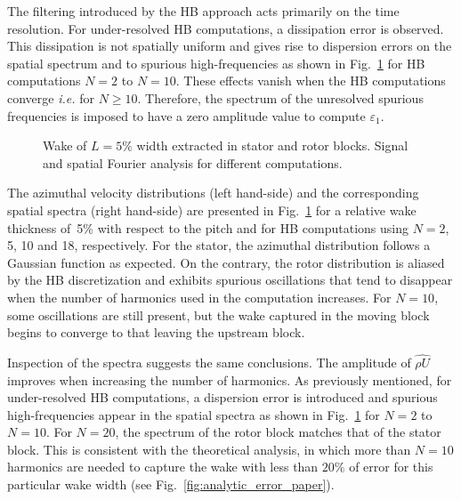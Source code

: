 The filtering introduced by the HB approach 
acts primarily on the time resolution. 
For under-resolved HB computations, a dissipation error is observed.
This dissipation is not spatially uniform and gives rise to
dispersion errors on the spatial spectrum and to spurious
high-frequencies as shown in 
Fig.~\ref{fig:spatial_crit} for HB computations $N=2$ to $N=10$.
These effects vanish when the HB computations converge
\emph{i.e.} for $N \geq 10$.
Therefore, the spectrum of the unresolved spurious frequencies 
is imposed to have a zero amplitude value to compute
$\varepsilon_1$.
\begin{figure}[htp]
  \centering
  \caption{Wake of $L=5\%$ width extracted in stator and rotor 
  blocks. Signal and spatial Fourier analysis for different computations.}
  \label{fig:spatial_crit}
\end{figure}

The azimuthal velocity distributions (left hand-side) and the corresponding spatial
spectra (right hand-side)
are presented in Fig.~\ref{fig:spatial_crit} 
for a relative wake thickness of~5\% with respect to the pitch 
and for HB computations using $N=2$, 5, 10 and 18, respectively.
For the stator, the azimuthal distribution follows a 
Gaussian function as expected. On the contrary, 
the rotor distribution is aliased by the HB discretization 
and exhibits spurious oscillations that tend to disappear
when the number of harmonics used in the computation 
increases.
For $N=10$, some oscillations are still present, 
but the wake captured in the moving block begins to 
converge to that leaving the upstream block.

Inspection of the spectra suggests the same conclusions.
The amplitude of $\widehat{\rho U}$ 
improves when increasing the number of harmonics.
As previously mentioned, for under-resolved HB computations,
a dispersion error is introduced and spurious high-frequencies appear 
in the spatial spectra as shown in Fig.~\ref{fig:spatial_crit}
for $N=2$ to $N=10$.
For $N=20$, the spectrum of the rotor 
block matches that of the stator block.
This is consistent with the theoretical analysis, in which more than 
$N=10$ harmonics are needed to capture the wake with less than $20\%$ 
of error for this particular
wake width (see Fig.~\ref{fig:analytic_error_paper}).

